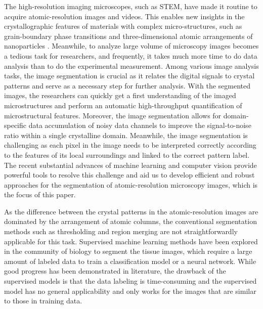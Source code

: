 \documentclass[twocolumn,amsmath, floatfix]{revtex4}
\begin{document}
The high-resolution imaging microscopes, such as STEM, have made it routine to acquire atomic-resolution images and videos. This enables new insights in the crystallographic features of materials with complex micro-structures, such as grain-boundary phase transitions \cite{Meiners2020, Meiners2019} and three-dimensional atomic arrangements of nanoparticles \cite{VanAert2011}. Meanwhile,  
to analyze large volume of microscopy images becomes a tedious task for researchers, and frequently, it takes much more time to do data analysis than to do the experimental measurement.  
Among various image analysis tasks, the image segmentation is crucial as it relates the digital signals to crystal patterns and serve as a necessary step for further analysis. With the segmented images, the researchers can quickly get a first understanding of the imaged microstructures and perform an automatic high-throughput quantification of microstructural features. Moreover, the image segmentation allows for domain-specific data accumulation of noisy data channels to improve the signal-to-noise ratio within a single crystalline domain. Meanwhile, the image segmentation is challenging as each pixel in the image needs to be interpreted correctly according to the features of its local surroundings and linked to the correct pattern label. The recent substantial advances of machine learning and computer vision provide powerful tools to resolve this challenge and aid us to develop efficient and robust approaches for the segmentation of atomic-resolution microscopy images, which is the focus of this paper.

As the difference between the crystal patterns in the atomic-resolution images are dominated by the arrangement of atomic columns, the conventional segmentation methods such as thresholding \cite{Sadowski2006, Mancas2005} and region merging \cite{Navlakha2013,Nock2004} are not straightforwardly applicable for this task.  Supervised machine learning methods \cite{Ignacio2017, Dang2019} have been explored in the community of biology to segment the tissue images, which require a large amount of labeled data to train a classification model or a neural network. While good progress has been demonstrated in literature, the drawback of the supervised models is that the data labeling is time-consuming and the supervised model has no general applicability and only works for the images that are similar to those in training data.
\end{document}
